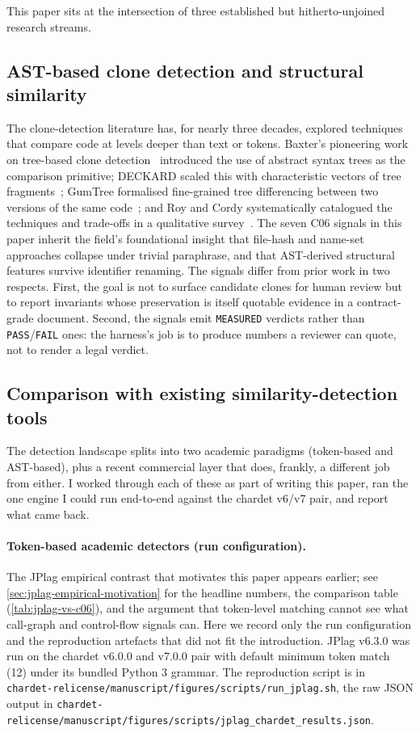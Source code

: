 \documentclass[11pt,letterpaper]{article}
\begin{document}
This paper sits at the intersection of three established but
hitherto-unjoined research streams.

\subsection{AST-based clone detection and structural similarity}
\label{sec:related-clone}

The clone-detection literature has, for nearly three decades,
explored techniques that compare code at levels deeper than text
or tokens. Baxter's pioneering work on tree-based clone
detection~\cite{baxter1998clone} introduced the use of abstract
syntax trees as the comparison primitive; DECKARD scaled this with
characteristic vectors of tree fragments~\cite{jiang2007deckard};
GumTree formalised fine-grained tree differencing between two
versions of the same code~\cite{falleri2014gumtree}; and Roy and
Cordy systematically catalogued the techniques and trade-offs in a
qualitative survey~\cite{roy2009comparison}. The seven C06 signals
in this paper inherit the field's foundational insight that
file-hash and name-set approaches collapse under trivial
paraphrase, and that AST-derived structural features survive
identifier renaming. The signals differ from prior work in two
respects. First, the goal is not to surface candidate clones for
human review but to report invariants whose preservation is itself
quotable evidence in a contract-grade document. Second, the signals
emit \texttt{MEASURED} verdicts rather than \texttt{PASS}/\texttt{FAIL}
ones: the harness's job is to produce numbers a reviewer can quote,
not to render a legal verdict.

\subsection{Comparison with existing similarity-detection tools}
\label{sec:related-tools}

The detection landscape splits into two academic paradigms (token-based
and AST-based), plus a recent commercial layer that does, frankly, a
different job from either. I worked through each of these as part of
writing this paper, ran the one engine I could run end-to-end against
the chardet v6/v7 pair, and report what came back.

\paragraph{Token-based academic detectors (run configuration).}
The JPlag empirical contrast that motivates this paper appears
earlier; see \cref{sec:jplag-empirical-motivation} for the headline
numbers, the comparison table (\cref{tab:jplag-vs-c06}), and the
argument that token-level matching cannot see what call-graph and
control-flow signals can. Here we record only the run configuration
and the reproduction artefacts that did not fit the introduction.
JPlag v6.3.0 was run on the chardet v6.0.0 and v7.0.0 pair with
default minimum token match (12) under its bundled Python 3 grammar.
The reproduction script is in
\texttt{chardet-relicense/manuscript/figures/scripts/run\_jplag.sh},
the raw JSON output in
\texttt{chardet-relicense/manuscript/figures/scripts/jplag\_chardet\_results.json}.
\end{document}
